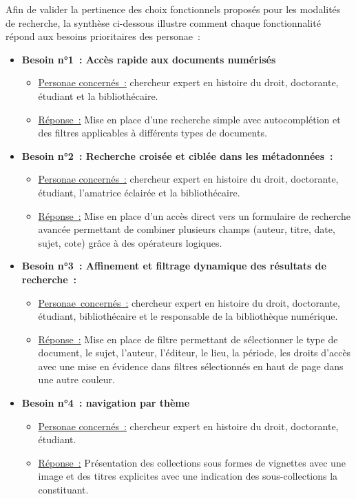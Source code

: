 Afin de valider la pertinence des choix fonctionnels proposés pour les modalités de recherche, la synthèse ci-dessous illustre comment chaque fonctionnalité répond aux besoins prioritaires des personae :
\begin{itemize}
	\item \textbf{Besoin n°1 : Accès rapide aux documents numérisés}
\begin{itemize}
	\item \uline{Personae concernés :} chercheur expert en histoire du droit, doctorante, étudiant et la bibliothécaire.
\item \uline{Réponse :} Mise en place d’une recherche simple avec autocomplétion et des filtres applicables à différents types de documents. 
\end{itemize}
\item \textbf{Besoin n°2 : Recherche croisée et ciblée dans les métadonnées :} 
\begin{itemize}
	\item \uline{Personae concernés :} chercheur expert en histoire du droit, doctorante, étudiant, l’amatrice éclairée et la bibliothécaire.
\item \uline{Réponse :} Mise en place d’un accès direct vers un formulaire de recherche avancée permettant de combiner plusieurs champs (auteur, titre, date, sujet, cote) grâce à des opérateurs logiques.
\end{itemize}
\item \textbf{Besoin n°3 : Affinement et filtrage dynamique des résultats de recherche :}
\begin{itemize}
	\item \uline{Personae concernés :} chercheur expert en histoire du droit, doctorante, étudiant, bibliothécaire et le responsable de la bibliothèque numérique. 
\item \uline{Réponse :} Mise en place de filtre permettant de sélectionner le type de document, le sujet, l’auteur, l’éditeur, le lieu, la période, les droits d’accès avec une mise en évidence dans filtres sélectionnés en haut de page dans une autre couleur.
\end{itemize}
\item \textbf{Besoin n°4 : navigation par thème}
\begin{itemize}
	\item \uline{Personae concernés :} chercheur expert en histoire du droit, doctorante, étudiant.
\item \uline{Réponse :} Présentation des collections sous formes de vignettes avec une image et des titres explicites avec une indication des sous-collections la constituant.

\end{itemize}
\end{itemize}

